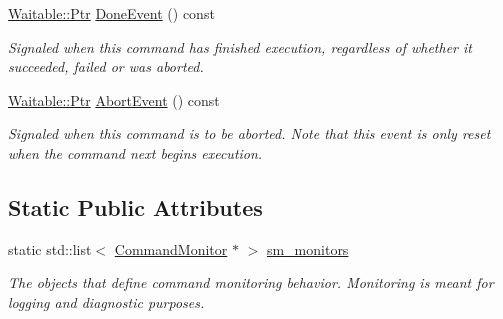 \begin{DoxyCompactItemize}
\mbox{\hyperlink{class_command_lib_1_1_waitable_ac74b6b91e48220146eada76a31cf2d9b}{Waitable\+::\+Ptr}} \mbox{\hyperlink{class_command_lib_1_1_command_a5f163dafd55fe63a5ed351e1543d02a3}{Done\+Event}} () const
\begin{DoxyCompactList}\small\item\em Signaled when this command has finished execution, regardless of whether it succeeded, failed or was aborted. \end{DoxyCompactList}\item 
\mbox{\hyperlink{class_command_lib_1_1_waitable_ac74b6b91e48220146eada76a31cf2d9b}{Waitable\+::\+Ptr}} \mbox{\hyperlink{class_command_lib_1_1_command_a1fdc8e982866dbbfb763af5d755f76dd}{Abort\+Event}} () const
\begin{DoxyCompactList}\small\item\em Signaled when this command is to be aborted. Note that this event is only reset when the command next begins execution. \end{DoxyCompactList}\end{DoxyCompactItemize}
\subsection*{Static Public Attributes}
\begin{DoxyCompactItemize}
\item 
static std\+::list$<$ \mbox{\hyperlink{class_command_lib_1_1_command_monitor}{Command\+Monitor}} $\ast$ $>$ \mbox{\hyperlink{class_command_lib_1_1_command_aa4ceb8d85a720bc5d9bac4be3afd7df5}{sm\+\_\+monitors}}
\begin{DoxyCompactList}\small\item\em The objects that define command monitoring behavior. Monitoring is meant for logging and diagnostic purposes. \end{DoxyCompactList}\end{DoxyCompactItemize}
